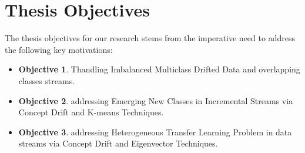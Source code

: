 \section{Thesis Objectives}
\label{sec:1_introduction_objectives}
The thesis objectives for our research stems from the imperative need to address the following key motivations:
\begin{itemize}
    \item \textbf{Objective 1}. Thandling Imbalanced Multiclass Drifted Data and overlapping classes streams.
    \item \textbf{Objective 2}. addressing Emerging New Classes in Incremental Streams via Concept Drift and K-means Techniques.
    \item \textbf{Objective 3}. addressing Heterogeneous Transfer Learning Problem in data streams via Concept Drift and Eigenvector Techniques.
\end{itemize}
